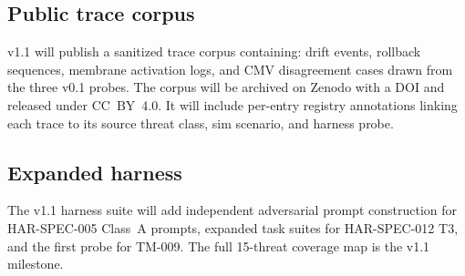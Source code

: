 \subsection{Public trace corpus}

v1.1 will publish a sanitized trace corpus containing:
drift events, rollback sequences, membrane activation logs, and
CMV disagreement cases drawn from the three v0.1 probes. The corpus
will be archived on Zenodo with a DOI and released under CC~BY~4.0.
It will include per-entry registry annotations linking each trace
to its source threat class, sim scenario, and harness probe.

\subsection{Expanded harness}

The v1.1 harness suite will add independent adversarial prompt
construction for HAR-SPEC-005 Class~A prompts, expanded task suites
for HAR-SPEC-012 T3, and the first probe for TM-009. The full 15-threat
coverage map is the v1.1 milestone.
